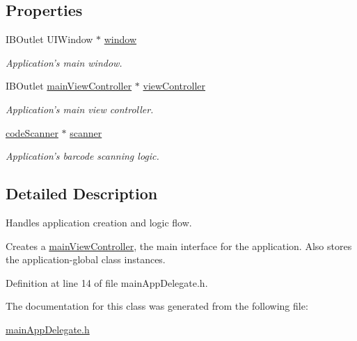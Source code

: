 \subsection*{Properties}
\begin{DoxyCompactItemize}
\item 
\hypertarget{interfacemain_app_delegate_a29a6fc1dc60e8f992bc999d19259b0c3}{
IBOutlet UIWindow $\ast$ \hyperlink{interfacemain_app_delegate_a29a6fc1dc60e8f992bc999d19259b0c3}{window}}
\label{interfacemain_app_delegate_a29a6fc1dc60e8f992bc999d19259b0c3}

\begin{DoxyCompactList}\small\item\em Application's main window. \end{DoxyCompactList}\item 
\hypertarget{interfacemain_app_delegate_afd47227af0358b615098dced397ce48d}{
IBOutlet \hyperlink{interfacemain_view_controller}{mainViewController} $\ast$ \hyperlink{interfacemain_app_delegate_afd47227af0358b615098dced397ce48d}{viewController}}
\label{interfacemain_app_delegate_afd47227af0358b615098dced397ce48d}

\begin{DoxyCompactList}\small\item\em Application's main view controller. \end{DoxyCompactList}\item 
\hypertarget{interfacemain_app_delegate_ac5e1230fe023706ddc2fa930e09d2587}{
\hyperlink{interfacecode_scanner}{codeScanner} $\ast$ \hyperlink{interfacemain_app_delegate_ac5e1230fe023706ddc2fa930e09d2587}{scanner}}
\label{interfacemain_app_delegate_ac5e1230fe023706ddc2fa930e09d2587}

\begin{DoxyCompactList}\small\item\em Application's barcode scanning logic. \end{DoxyCompactList}\end{DoxyCompactItemize}


\subsection{Detailed Description}
Handles application creation and logic flow. 

Creates a \hyperlink{interfacemain_view_controller}{mainViewController}, the main interface for the application. Also stores the application-\/global class instances. 

Definition at line 14 of file mainAppDelegate.h.



The documentation for this class was generated from the following file:\begin{DoxyCompactItemize}
\item 
\hyperlink{main_app_delegate_8h}{mainAppDelegate.h}\end{DoxyCompactItemize}
